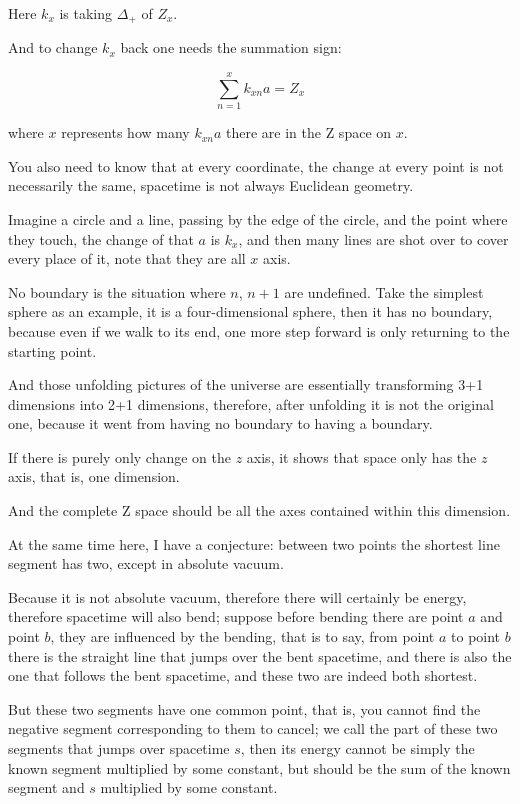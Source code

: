 \documentclass[UTF8]{article}
\begin{document}
Here \(k_x\) is taking \(\Delta_+\) of \(Z_x\).

And to change \(k_x\) back one needs the summation sign:

\begin{equation}
\sum_{n=1}^{x}k_{xn}a=Z_x
\end{equation}

where \(x\) represents how many \(k_{xn}a\) there are in the Z space on \(x\).

You also need to know that at every coordinate, the change at every point is not necessarily the same, spacetime is not always Euclidean geometry.

Imagine a circle and a line, passing by the edge of the circle, and the point where they touch, the change of that \(a\) is \(k_x\), and then many lines are shot over to cover every place of it, note that they are all \(x\) axis.

No boundary is the situation where \(n\), \(n+1\) are undefined. Take the simplest sphere as an example, it is a four-dimensional sphere, then it has no boundary, because even if we walk to its end, one more step forward is only returning to the starting point.

And those unfolding pictures of the universe are essentially transforming 3+1 dimensions into 2+1 dimensions, therefore, after unfolding it is not the original one, because it went from having no boundary to having a boundary.

If there is purely only change on the \(z\) axis, it shows that space only has the \(z\) axis, that is, one dimension.

And the complete Z space should be all the axes contained within this dimension.

At the same time here, I have a conjecture: between two points the shortest line segment has two, except in absolute vacuum.

Because it is not absolute vacuum, therefore there will certainly be energy, therefore spacetime will also bend; suppose before bending there are point \(a\) and point \(b\), they are influenced by the bending, that is to say, from point \(a\) to point \(b\) there is the straight line that jumps over the bent spacetime, and there is also the one that follows the bent spacetime, and these two are indeed both shortest.

But these two segments have one common point, that is, you cannot find the negative segment corresponding to them to cancel; we call the part of these two segments that jumps over spacetime \(s\), then its energy cannot be simply the known segment multiplied by some constant, but should be the sum of the known segment and \(s\) multiplied by some constant.
\end{document}
